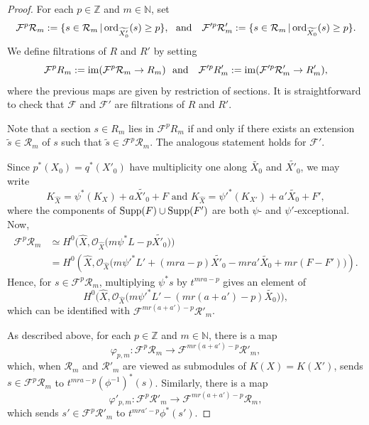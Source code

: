 \documentclass[12pt,reqno]{amsart}%
\newcommand{\Z}{{\mathbb{Z} }}
\newcommand{\cR}{{\mathcal{R}}}
\newcommand{\cF}{\mathcal{F}}
\newcommand{\Supp}{{\rm Supp}}
\newcommand{\ord}{{\rm ord}}
\theoremstyle{definition}
\theoremstyle{remark}
\newcommand{\cO}{{\mathcal{O}}}
\newcommand{\im}{{\rm im}}
\newcommand{\N}{{\mathbb{N}}}
\begin{document}
\begin{proof}
For each $p\in \Z$ and $m\in \N$, set
  \[
  \cF^p \cR_m:= \{ s\in  \cR_m \, \vert \, \ord_{\widetilde{X'_0}} (s) \geq p \},  \mbox{\ \ and \ \ }
    \cF'^p \cR'_m := \{ s\in \cR_m \, \vert \, \ord_{\widetilde{X_0}} (s) \geq p \}
    .\]
We define filtrations of $R$ and $R'$ by setting 
\[
\cF^{p} R_m : = \im( \cF^p \cR_m \to R_m) 
 \mbox{\ \ and \ \ }
\cF'^{p} R'_m : = \im( \cF'^p \cR'_m  \to R'_m),
\]
where the previous maps are given by restriction of sections.  It is straightforward to check that $\cF$ and $\cF'$ are filtrations of $R$ and $R'$. 

Note that a section $s \in R_m$ lies in $\cF^p R_m$  if and only if there exists an extension $\tilde{s} \in \cR_m$ of $s$ such that $\tilde{s} \in  \cF^p \cR_m$. The analogous statement holds for $\cF'$.

\medskip


 Since $p^*(X_0) = q^*(X'_0)$ have multiplicity one along $\widetilde{X_0}$ and $\widetilde{X'_0}$, we may write 
\[
K_{ \widehat{X}}  = \psi^*(K_X)  + a \widetilde{X'_0} +  F    \mbox{\ \ and \ \ }
K_{ \widehat{X}}  = \psi'^*(K_{X'})  + a' \widetilde{X_0} + F',
\]
where the components of $\Supp(F) \cup \Supp(F')$ are both $\psi$- and $\psi'$-exceptional. 
Now,
\begin{align*}
\cF^p \cR_m& \simeq H^0\Big(
\widehat{X},\cO_{\widehat{X}} \big(m \psi^* L -p \widetilde{X'_0} \big)\Big)  \\
	&= H^0 \left(
	\widehat{X}, \cO_{\widehat{X}} \big(m \psi'^*L' +(mra- p )\widetilde{X'_0}- mra' \widetilde{X_0}+mr(F-F' ) \big) 
	\right). 
\end{align*}
Hence, for $s\in \cF^p  \cR_m$, multiplying $\psi^*s$ by $t^{mra -p}$ gives an element of 
\[
H^0 \Big(\widehat{X},\cO_{\widehat{X}}\big(m\psi'^*L'  -( mr(a+a')- p) \widetilde{X_0}\big) \Big),\]
which can be identified with  $\cF^{mr(a+a')-p}\cR'_m$. 

As described above, for each $p\in \Z$ and $m\in \N$, there is a map
 \[\varphi_{p,m}:
\cF^{p}\cR_m \longrightarrow 
\cF^{mr(a+a')-p} \cR'_m
,\]
which, when  $\cR_m$ and $\cR'_m$ are viewed as submodules of $K(X)=K(X')$,  sends $s\in \cF^{p}\cR_m$ to $t^{mra-p}({\phi^{-1}})^*(s)$. 
 Similarly, there is a map 
 \[\varphi'_{p,m}:
\cF^{p} \cR'_m \longrightarrow 
\cF^{mr(a+a')-p} \cR_m
,\]
which sends $s' \in \cF^{p} \cR'_m$ to $t^{mra'-p}\phi^*(s')$.



\end{proof}
\end{document}
